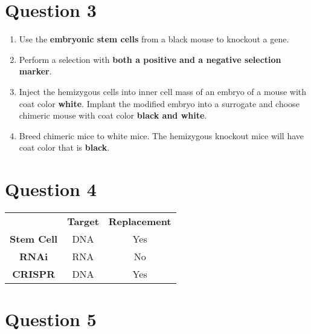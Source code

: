 \documentclass{article}
\begin{document}
\section*{Question 3}

\begin{enumerate}
    \item Use the \textbf{embryonic stem cells} from a black mouse to knockout a gene.
    
    \item Perform a selection with \textbf{both a positive and a negative selection marker}.
    
    \item Inject the hemizygous cells into inner cell mass of an embryo of a mouse with coat color \textbf{white}. Implant the modified embryo into a surrogate and choose chimeric mouse with coat color \textbf{black and white}.
    
    \item Breed chimeric mice to white mice. The hemizygous knockout mice will have coat color that is \textbf{black}.
\end{enumerate}

\section*{Question 4}

\begin{center}
    \begin{tabular}{c c c}
        & \textbf{Target} & \textbf{Replacement} \\
        \textbf{Stem Cell} & DNA & Yes \\
        \textbf{RNAi} & RNA & No\\
        \textbf{CRISPR} & DNA & Yes
    \end{tabular}
\end{center}

\section*{Question 5}
\end{document}
